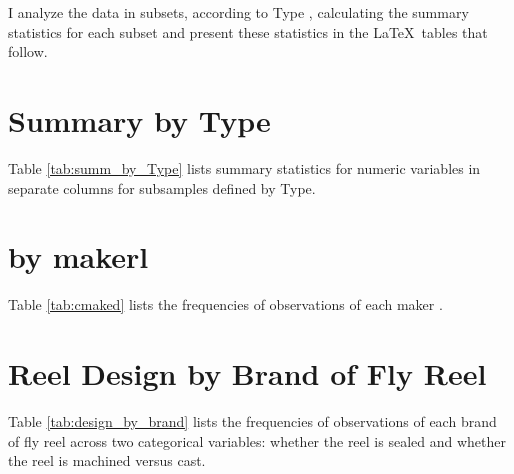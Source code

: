 \documentclass[11pt]{article}
\begin{document}
\medskip
\noindent
I analyze the data in subsets, according to Type , 
calculating the summary statistics for each subset and present these 
statistics in the \LaTeX\ tables that follow.

\vfill


\pagebreak
\section{Summary by Type}

Table \ref{tab:summ_by_Type} lists summary statistics for numeric variables
in separate columns for subsamples defined by Type. 




\pagebreak
\section{by makerl}

Table \ref{tab:cmaked} lists the frequencies of observations of 
each maker . 



\pagebreak
\section{Reel Design by Brand of Fly Reel}

Table \ref{tab:design_by_brand} lists the frequencies of observations of 
each brand of fly reel across two categorical variables:
whether the reel is sealed
and whether the reel is machined versus cast. 





\end{document}
